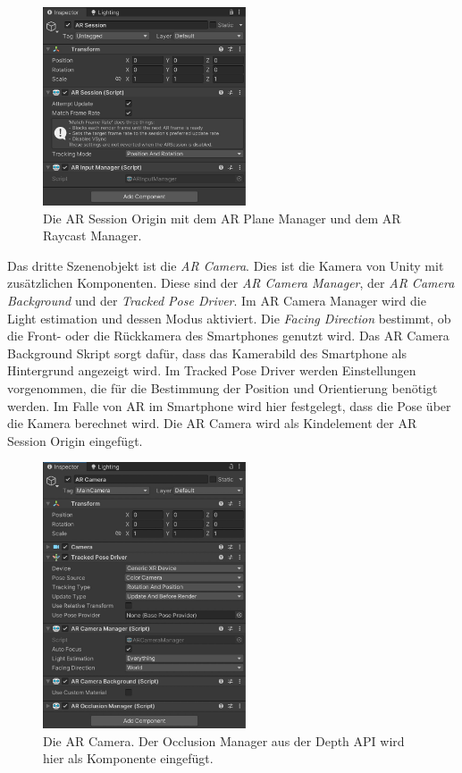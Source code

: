 \begin{figure}[H]
    \centering
    \includegraphics[width=6cm]{img/anwendung/technisch/ar-setup/setup-arsessionorigin.jpg}
    \caption{Die AR Session Origin mit dem AR Plane Manager und dem AR Raycast Manager.}
    \label{fig:anwendung-umsetzung-arsessionorigin}
\end{figure}

Das dritte Szenenobjekt ist die \textit{AR Camera}. Dies ist die Kamera von Unity mit zusätzlichen Komponenten. Diese sind der \textit{AR Camera Manager}, der \textit{AR Camera Background} und der \textit{Tracked Pose Driver}. Im AR Camera Manager wird die Light estimation und dessen Modus aktiviert. Die \textit{Facing Direction} bestimmt, ob die Front- oder die Rückkamera des Smartphones genutzt wird. Das AR Camera Background Skript sorgt dafür, dass das Kamerabild des Smartphone als Hintergrund angezeigt wird. Im Tracked Pose Driver werden Einstellungen vorgenommen, die für die Bestimmung der Position und Orientierung benötigt werden. Im Falle von AR im Smartphone wird hier festgelegt, dass die Pose über die Kamera berechnet wird. Die AR Camera wird als Kindelement der AR Session Origin eingefügt.

\begin{figure}[H]
    \centering
    \includegraphics[width=6cm]{img/anwendung/technisch/ar-setup/setup-arcamera.jpg}
    \caption{Die AR Camera. Der Occlusion Manager aus der Depth API wird hier als Komponente eingefügt.}
    \label{fig:anwendung-umsetzung-arcamera}
\end{figure}

